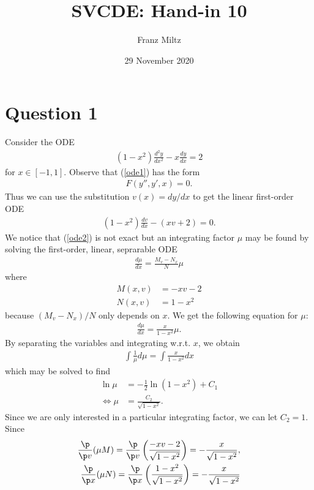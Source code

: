 \documentclass{article}
\begin{document}
\title{SVCDE: Hand-in 10}
\author{Franz Miltz}
\date{29 November 2020}
\maketitle


\section*{Question 1}


Consider the ODE
\begin{align}
    \label{ode1}
    (1-x^2)\frac{d^2y}{dx^2} - x\frac{dy}{dx} = 2
\end{align}
for $x\in [-1,1]$. Observe that (\ref{ode1}) has the form
\begin{align*}
    F(y'',y',x)=0.
\end{align*}
Thus we can use the substitution $v(x)=dy/dx$ to get the linear
first-order ODE
\begin{align}
    \label{ode2}
    (1-x^2)\frac{dv}{dx}-(xv+2) = 0.
\end{align}
We notice that (\ref{ode2}) is not exact but an integrating factor $\mu$ may
be found by solving the first-order, linear, seprarable ODE
\begin{align*}
    \frac{d\mu}{dx} = \frac{M_v-N_x}{N}\mu
\end{align*}
where
\begin{align*}
    M(x,v) & = -xv-2 \\
    N(x,v) & = 1-x^2
\end{align*}
because $(M_v-N_x)/N$ only depends on $x$. We get the following equation for
$\mu$:
\begin{align*}
    \frac{d\mu}{dx}=\frac{x}{1-x^2}\mu.
\end{align*}
By separating the variables and integrating w.r.t. $x$, we obtain
\begin{align*}
    \int \frac{1}{\mu}d\mu = \int \frac{x}{1-x^2}dx
\end{align*}
which may be solved to find
\begin{align*}
    \ln\mu              & = -\frac{1}{2}\ln(1-x^2)+C_1 \\
    \Leftrightarrow \mu & =\frac{C_2}{\sqrt{1-x^2}}.
\end{align*}
Since we are only interested in a particular integrating factor, we can
let $C_2=1$. Since
\begin{align*}
    \frac{\p}{\p v}(\mu M) = \frac{\p}{\p v}\left(\frac{-xv-2}{\sqrt{1-x^2}}\right)=-\frac{x}{\sqrt{1-x^2}}, \\
    \frac{\p}{\p x}(\mu N) = \frac{\p}{\p x}\left(\frac{1-x^2}{\sqrt{1-x^2}}\right)=-\frac{x}{\sqrt{1-x^2}}
\end{align*}
\end{document}
